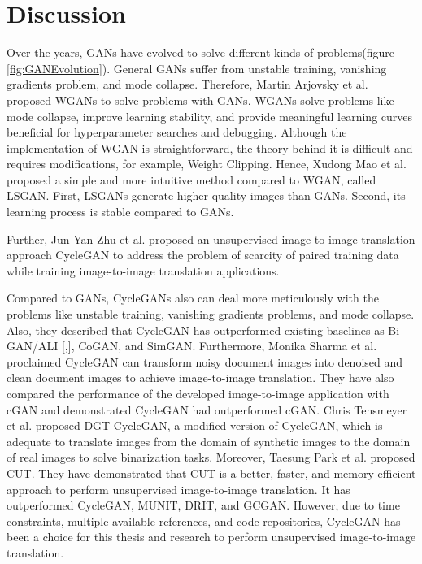 \section{Discussion}\label{rwdiscussion}
Over the years, \acp{GAN} have evolved to solve different kinds of problems(figure \ref{fig:GANEvolution}). General \acp{GAN} suffer from unstable training, vanishing gradients problem, and mode collapse. Therefore, Martin Arjovsky et al.\cite{arjovsky2017wasserstein} proposed \acp{WGAN} to solve problems with \acp{GAN}. \acp{WGAN} solve problems like mode collapse, improve learning stability, and provide meaningful learning curves beneficial for hyperparameter searches and debugging\cite{arjovsky2017wasserstein}. Although the implementation of \ac{WGAN} is straightforward, the theory behind it is difficult and requires modifications, for example, Weight Clipping\cite{gulrajani2017improved}. Hence, Xudong Mao et al.\cite{mao2017squares} proposed a simple and more intuitive method compared to \ac{WGAN}, called \ac{LSGAN}. First, \acp{LSGAN} generate higher quality images than \acp{GAN}\cite{mao2017squares}. Second, its learning process is stable compared to \acp{GAN}\cite{mao2017squares}. 



Further, Jun-Yan Zhu et al.\cite{zhu2020unpaired} proposed an unsupervised image-to-image translation approach \ac{CycleGAN} to address the problem of scarcity of paired training data while training  image-to-image translation applications. 



Compared to \acp{GAN}, \acp{CycleGAN} also can deal more meticulously with the problems like unstable training, vanishing gradients problems, and mode collapse. Also, they described that \ac{CycleGAN} has outperformed existing baselines as Bi-GAN/ALI [\cite{donahue2017adversarial},\cite{dumoulin2017adversarially}], CoGAN\cite{liu2016coupled}, and SimGAN\cite{shrivastava2017learning}. Furthermore, Monika Sharma et al.\cite{sharma2019learning} proclaimed  \ac{CycleGAN} can transform noisy document images into denoised and clean document images to achieve image-to-image translation. They have also compared the performance of the developed image-to-image application with \ac{cGAN} and demonstrated \ac{CycleGAN} had outperformed \ac{cGAN}. Chris Tensmeyer et al.\cite{8978087} proposed DGT-CycleGAN, a modified version of \ac{CycleGAN}, which is adequate to translate images from the domain of synthetic images to the domain of real images to solve binarization tasks. Moreover, Taesung Park et al.\cite{park2020contrastive} proposed \ac{CUT}. They have demonstrated that \ac{CUT} is a better, faster, and memory-efficient approach to perform unsupervised image-to-image translation. It has outperformed \ac{CycleGAN}\cite{zhu2020unpaired}, \ac{MUNIT}\cite{liu2018unsupervised}, \ac{DRIT}\cite{lee2019drit}, and \ac{GCGAN}\cite{fu2018geometryconsistent}. However, due to time constraints, multiple available references, and code repositories, \ac{CycleGAN} has been a choice for this thesis and research to perform unsupervised image-to-image translation. 

